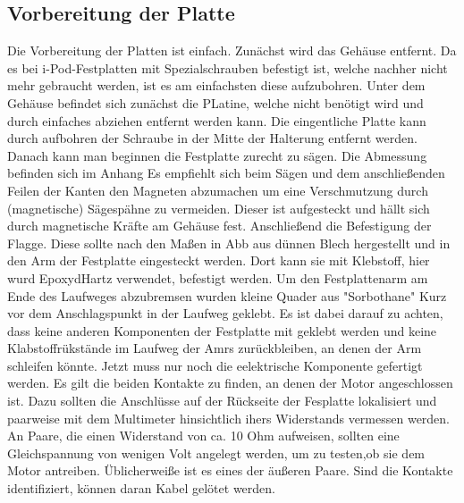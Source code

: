 \subsection{Vorbereitung der Platte}
Die Vorbereitung der Platten ist einfach. Zunächst wird das Gehäuse entfernt. Da es bei i-Pod-Festplatten mit Spezialschrauben befestigt ist, welche nachher nicht mehr gebraucht werden, ist es am einfachsten diese aufzubohren. Unter dem Gehäuse befindet sich zunächst die PLatine, welche nicht benötigt wird und durch einfaches abziehen entfernt werden kann. Die eingentliche Platte kann durch aufbohren der Schraube in der Mitte der Halterung entfernt werden. Danach kann man beginnen die Festplatte zurecht zu sägen. Die Abmessung befinden sich im Anhang %
Es empfiehlt sich beim Sägen und dem anschließenden Feilen der Kanten den Magneten abzumachen um eine Verschmutzung durch (magnetische) Sägespähne zu vermeiden. Dieser ist aufgesteckt und hällt sich durch magnetische Kräfte am Gehäuse fest. 
Anschließend die Befestigung der Flagge. Diese sollte nach den Maßen in Abb %
aus dünnen Blech hergestellt und in den Arm der Festplatte eingesteckt werden. Dort kann sie mit Klebstoff, hier wurd EpoxydHartz verwendet, befestigt werden.
Um den Festplattenarm am Ende des Laufweges abzubremsen wurden kleine Quader aus "Sorbothane" %
Kurz vor dem Anschlagspunkt in der Laufweg geklebt. Es ist dabei darauf zu achten, dass keine anderen Komponenten der Festplatte mit geklebt werden und keine Klabstoffrükstände im Laufweg der Amrs zurückbleiben, an denen der Arm schleifen könnte.
Jetzt muss nur noch die eelektrische Komponente gefertigt werden. Es gilt die beiden Kontakte zu finden, an denen der Motor angeschlossen ist. Dazu sollten die Anschlüsse auf der Rückseite der Fesplatte lokalisiert und paarweise mit dem Multimeter hinsichtlich ihers Widerstands vermessen werden. An Paare, die einen Widerstand von ca. 10 Ohm aufweisen, sollten eine Gleichspannung von wenigen Volt angelegt werden, um zu testen,ob sie dem Motor antreiben. Üblicherweiße ist es eines der äußeren Paare. Sind die Kontakte identifiziert, können daran Kabel gelötet werden. 